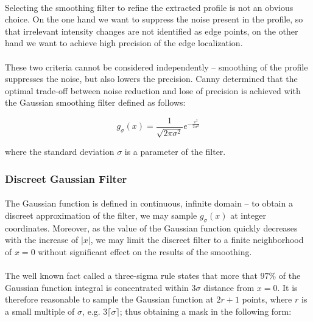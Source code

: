 \paragraph*{}
Selecting the smoothing filter to refine the extracted profile is not an obvious choice. On the one hand we want to suppress the noise present in the profile, so that irrelevant intensity changes are not identified as edge points, on the other hand we want to achieve high precision of the edge localization. 

\paragraph*{}
These two criteria cannot be considered independently -- smoothing of the profile suppresses the noise, but also lowers the precision. Canny determined\cite{Canny86} that the optimal trade-off between noise reduction and lose of precision is achieved with the Gaussian smoothing filter defined as follows:

\[
    g_{\sigma}(x)= \frac{1}{\sqrt{2\pi \sigma^2}} e^{-\frac{x^2}{2 \sigma^2}}
\]

where the standard deviation $\sigma$ is a parameter of the filter.

\subsubsection{Discreet Gaussian Filter}

\paragraph*{}
The Gaussian function is defined in continuous, infinite domain -- to obtain a discreet approximation of the filter, we may sample $g_{\sigma}(x)$ at integer coordinates\cite{JainKasturi95}. Moreover, as the value of the Gaussian function quickly decreases with the increase of $|x|$, we may limit the discreet filter to a finite neighborhood of $x = 0$ without significant effect on the results of the smoothing. 

\paragraph*{}
The well known fact called a three-sigma rule states that more that $97\%$ of the Gaussian function integral is concentrated within $3 \sigma$ distance from $x = 0$. It is therefore reasonable to sample the Gaussian function at $2r + 1$ points, where $r$ is a small multiple of $\sigma$, e.g. $3 \lceil \sigma \rceil$; thus obtaining a mask in the following form:


